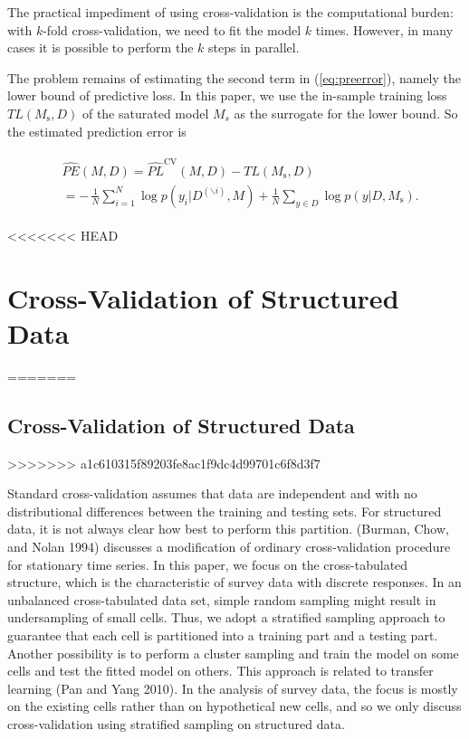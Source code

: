 \documentclass[11pt,article,oneside]{memoir}
\begin{document}
The practical impediment of using cross-validation is the computational
burden: with \(k\)-fold cross-validation, we need to fit the model \(k\)
times. However, in many cases it is possible to perform the \(k\) steps
in parallel.

The problem remains of estimating the second term in
(\ref{eq:preerror}), namely the lower bound of predictive loss. In this
paper, we use the in-sample training loss \(TL(M_{\text{s}}, D)\) of the
saturated model \(M_s\) as the surrogate for the lower bound. So the
estimated prediction error is

\begin{align}
\begin{split}
  \label{eq:esti_preerror}
  &\widehat{PE}(M, D)=\widehat{PL}^{\text{CV}}(M,D)-TL(M_{\text{s}},D)\\
  &= -\,\frac{1}{N}\sum_{i=1}^N\log p(y_i|D^{(\backslash i)},
  M)+\frac{1}{N}\sum_{y\in D}\log p(y | D, M_{\text{s}}).
\end{split}
\end{align}

<<<<<<< HEAD
\section{Cross-Validation of Structured
Data}\label{cross-validation-of-structured-data}
=======
\subsection{Cross-Validation of Structured Data}
>>>>>>> a1c610315f89203fe8ac1f9dc4d99701c6f8d3f7

Standard cross-validation assumes that data are independent and with no
distributional differences between the training and testing sets. For
structured data, it is not always clear how best to perform this
partition. (Burman, Chow, and Nolan 1994) discusses a modification of
ordinary cross-validation procedure for stationary time series. In this
paper, we focus on the cross-tabulated structure, which is the
characteristic of survey data with discrete responses. In an unbalanced
cross-tabulated data set, simple random sampling might result in
undersampling of small cells. Thus, we adopt a stratified sampling
approach to guarantee that each cell is partitioned into a training part
and a testing part. Another possibility is to perform a cluster sampling
and train the model on some cells and test the fitted model on others.
This approach is related to transfer learning (Pan and Yang 2010). In
the analysis of survey data, the focus is mostly on the existing cells
rather than on hypothetical new cells, and so we only discuss
cross-validation using stratified sampling on structured data.
\end{document}
